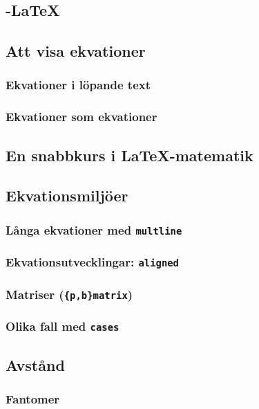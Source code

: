 \documentclass[swe,12pt]{skrapport}
\newcommand\env[1]{\texttt{#1}}							%
\begin{document}
	\subsection{\AmS-\LaTeX}
	
	\subsection{Att visa ekvationer}
	\subsubsection{Ekvationer i löpande text}
	\subsubsection{Ekvationer som ekvationer}
	
	\subsection{En snabbkurs i \LaTeX-matematik}
	
	\subsection{Ekvationsmiljöer}
	\subsubsection{Långa ekvationer med \env{multline}}
	\subsubsection{Ekvationsutvecklingar: \env{aligned}}
	\subsubsection{Matriser (\env{\{p,b\}matrix})}
	\subsubsection{Olika fall med \env{cases}}
	
	\subsection{Avstånd}
	\subsubsection{Fantomer}
	
\end{document}
